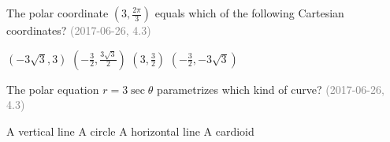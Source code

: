 \documentclass[12pt]{exam}
\newcommand{\questionDate}[1]{\textcolor{gray}{(#1)}}
\newcommand{\<}{\langle}
\renewcommand{\>}{\rangle}
\begin{document}
\begin{questions}
\newpage

  \question
  The polar coordinate \((3,\frac{2\pi}{3})\)
  equals which of the following Cartesian coordinates?
  \questionDate{2017-06-26, 4.3}
  \begin{choices}
    \choice
      \((-3\sqrt 3,3)\)
    \CorrectChoice
      \((-\frac{3}{2},\frac{3\sqrt 3}{2})\)
    \choice
      \((3,\frac{3}{2})\)
    \choice
      \((-\frac{3}{2},-3\sqrt 3)\)
  \end{choices}

  \question
  The polar equation \(r=3\sec\theta\)
  parametrizes which kind of curve?
  \questionDate{2017-06-26, 4.3}
  \begin{choices}
    \choice
      A vertical line
    \choice
      A circle
    \CorrectChoice
      A horizontal line
    \choice
      A cardioid
  \end{choices}


\end{questions}
\end{document}
